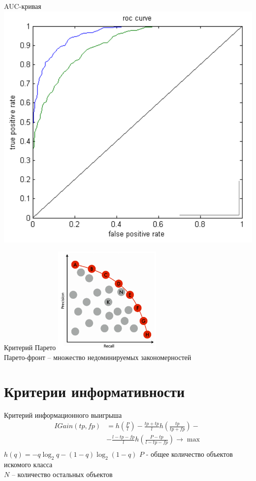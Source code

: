 \documentclass[10pt]{beamer}
\begin{document}
{
\begin{frame}{AUC-кривая}
  \centering
  \includegraphics[height=0.7 \textheight, keepaspectratio = true]{images/auc}   \\  
\end{frame}
}

\begin{frame}{Критерий Парето}
  \centering
  \includegraphics[height=150pt, keepaspectratio = true]{images/pareto}   \\
  Парето-фронт -- множество недоминируемых закономерностей
\end{frame}

\section{Критерии информативности}

\begin{frame}{Критерий информационного выигрыша}
  \begin{align*} 
		IGain(tp,fp) &= h(\frac{P}{l}) - \frac{tp+tp}{l}h(\frac{tp}{tp+fp}) - \\
		&- \frac{l-tp-fp}{l}h(\frac{P-tp}{l-tp-fp}) \rightarrow \max \\
	\end{align*} 
	$h(q) = -q\log_2q - (1-q)\log_2(1-q)$
	\bigbreak	
	$P$ - общее количество объектов искомого класса\\
	$N$ -- количество остальных объектов
\end{frame}
\end{document}
